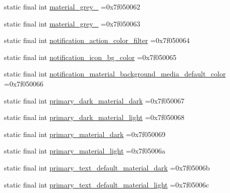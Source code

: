 \begin{DoxyCompactItemize}
\item 
static final int \mbox{\hyperlink{classbr_1_1unb_1_1cic_1_1mp_1_1marketmaster_1_1R_1_1color_a2e87a9a05ae0ef0170cfeee134359e55}{material\+\_\+grey\+\_}} =0x7f050062
\item 
static final int \mbox{\hyperlink{classbr_1_1unb_1_1cic_1_1mp_1_1marketmaster_1_1R_1_1color_a3790b8e8c8784b6f90bada464c280839}{material\+\_\+grey\+\_}} =0x7f050063
\item 
static final int \mbox{\hyperlink{classbr_1_1unb_1_1cic_1_1mp_1_1marketmaster_1_1R_1_1color_aabee1e48676ef2d1428972359f57f16d}{notification\+\_\+action\+\_\+color\+\_\+filter}} =0x7f050064
\item 
static final int \mbox{\hyperlink{classbr_1_1unb_1_1cic_1_1mp_1_1marketmaster_1_1R_1_1color_ab3c5367c241404829d167b72280caa21}{notification\+\_\+icon\+\_\+bg\+\_\+color}} =0x7f050065
\item 
static final int \mbox{\hyperlink{classbr_1_1unb_1_1cic_1_1mp_1_1marketmaster_1_1R_1_1color_aa1184d9eff63d54d9993255d30308dfd}{notification\+\_\+material\+\_\+background\+\_\+media\+\_\+default\+\_\+color}} =0x7f050066
\item 
static final int \mbox{\hyperlink{classbr_1_1unb_1_1cic_1_1mp_1_1marketmaster_1_1R_1_1color_ae3bb06769d663c394dbe441e992b301f}{primary\+\_\+dark\+\_\+material\+\_\+dark}} =0x7f050067
\item 
static final int \mbox{\hyperlink{classbr_1_1unb_1_1cic_1_1mp_1_1marketmaster_1_1R_1_1color_a1e4539db4c52b1375ace28949eca925c}{primary\+\_\+dark\+\_\+material\+\_\+light}} =0x7f050068
\item 
static final int \mbox{\hyperlink{classbr_1_1unb_1_1cic_1_1mp_1_1marketmaster_1_1R_1_1color_a0044e050077dcba1b415245a756b7ab5}{primary\+\_\+material\+\_\+dark}} =0x7f050069
\item 
static final int \mbox{\hyperlink{classbr_1_1unb_1_1cic_1_1mp_1_1marketmaster_1_1R_1_1color_ac50fb742aba29b1e1e4c04f7f633c15c}{primary\+\_\+material\+\_\+light}} =0x7f05006a
\item 
static final int \mbox{\hyperlink{classbr_1_1unb_1_1cic_1_1mp_1_1marketmaster_1_1R_1_1color_a693bf006335de3b9f3e5d70955588873}{primary\+\_\+text\+\_\+default\+\_\+material\+\_\+dark}} =0x7f05006b
\item 
static final int \mbox{\hyperlink{classbr_1_1unb_1_1cic_1_1mp_1_1marketmaster_1_1R_1_1color_a0994d42d3595abfbee34223de6a25472}{primary\+\_\+text\+\_\+default\+\_\+material\+\_\+light}} =0x7f05006c
\item 

\end{DoxyCompactItemize}
